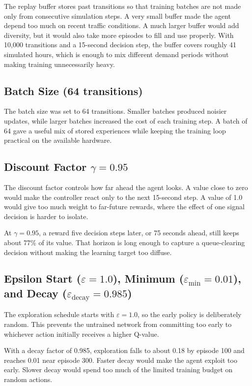 The replay buffer stores past transitions so that training batches are
not made only from consecutive simulation steps. A very small buffer made
the agent depend too much on recent traffic conditions. A much larger
buffer would add diversity, but it would also take more episodes to fill
and use properly. With 10,000 transitions and a 15-second decision step,
the buffer covers roughly 41 simulated hours, which is enough to mix
different demand periods without making training unnecessarily heavy.

\subsection{Batch Size (64 transitions)}

The batch size was set to 64 transitions. Smaller batches produced
noisier updates, while larger batches increased the cost of each training
step. A batch of 64 gave a useful mix of stored experiences while keeping
the training loop practical on the available hardware.

\subsection{Discount Factor \( \gamma = 0.95 \)}

The discount factor controls how far ahead the agent looks. A value close
to zero would make the controller react only to the next 15-second step.
A value of 1.0 would give too much weight to far-future rewards, where
the effect of one signal decision is harder to isolate.

At \( \gamma = 0.95 \), a reward five decision steps later, or 75 seconds
ahead, still keeps about 77\% of its value. That horizon is long enough
to capture a queue-clearing decision without making the learning target
too diffuse.

\subsection{Epsilon Start (\( \varepsilon = 1.0 \)), Minimum (\( \varepsilon_{\min} = 0.01 \)), and Decay (\( \varepsilon_{\text{decay}} = 0.985 \))}

The exploration schedule starts with \( \varepsilon = 1.0 \), so the
early policy is deliberately random. This prevents the untrained network
from committing too early to whichever action initially receives a higher
Q-value.

With a decay factor of 0.985, exploration falls to about 0.18 by episode
100 and reaches 0.01 near episode 300. Faster decay would make the agent
exploit too early. Slower decay would spend too much of the limited
training budget on random actions.

